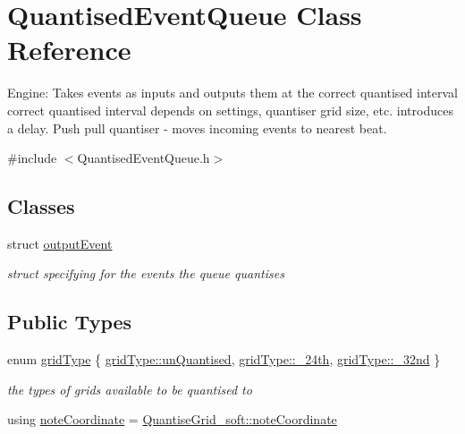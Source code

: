 \hypertarget{classQuantisedEventQueue}{}\section{Quantised\+Event\+Queue Class Reference}
\label{classQuantisedEventQueue}


Engine\+: Takes events as inputs and outputs them at the correct quantised interval correct quantised interval depends on settings, quantiser grid size, etc. introduces a delay. Push pull quantiser -\/ moves incoming events to nearest beat.  




{\ttfamily \#include $<$Quantised\+Event\+Queue.\+h$>$}

\subsection*{Classes}
\begin{DoxyCompactItemize}
\item 
struct \hyperlink{structQuantisedEventQueue_1_1outputEvent}{output\+Event}
\begin{DoxyCompactList}\small\item\em struct specifying for the events the queue quantises \end{DoxyCompactList}\end{DoxyCompactItemize}
\subsection*{Public Types}
\begin{DoxyCompactItemize}
\item 
enum \hyperlink{classQuantisedEventQueue_ae186d50bd503038452edbbdd0c7c259e}{grid\+Type} \{ \hyperlink{classQuantisedEventQueue_ae186d50bd503038452edbbdd0c7c259eac4f7d29e17ae6df87548a7e5a5dc94d6}{grid\+Type\+::un\+Quantised}, 
\hyperlink{classQuantisedEventQueue_ae186d50bd503038452edbbdd0c7c259ea4166cc8b14a93b3920f09fcebbfa435a}{grid\+Type\+::\+\_\+24th}, 
\hyperlink{classQuantisedEventQueue_ae186d50bd503038452edbbdd0c7c259eac9582d52391fa58d898a389301076561}{grid\+Type\+::\+\_\+32nd}
 \}\begin{DoxyCompactList}\small\item\em the types of grids available to be quantised to \end{DoxyCompactList}
\item 
using \hyperlink{classQuantisedEventQueue_a7e4af70d71f881cb31e643f59c6cf6e6}{note\+Coordinate} = \hyperlink{structQuantiseGrid__soft_1_1noteCoordinate}{Quantise\+Grid\+\_\+soft\+::note\+Coordinate}
\end{DoxyCompactItemize}
